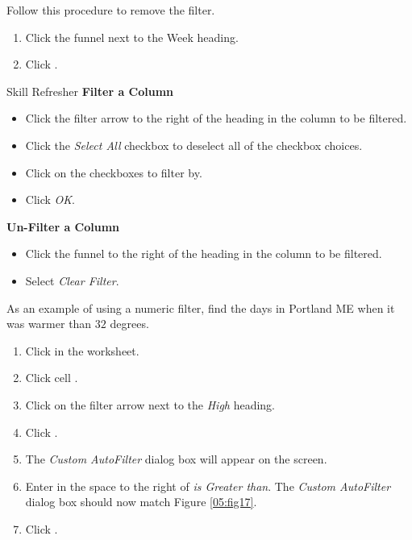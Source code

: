Follow this procedure to remove the filter.

\begin{enumerate}
	\item Click the funnel next to the Week heading.
	\item Click .
\end{enumerate}

\begin{center}
	\begin{sklbox}{Skill Refresher}
		\textbf{Filter a Column}
		\\
		\begin{itemize}
			\setlength{\itemsep}{0pt}
			\setlength{\parskip}{0pt}
			\setlength{\parsep}{0pt}

			\item Click the filter arrow to the right of the heading in the column to be filtered.
			\item Click the \textit{Select All} checkbox to deselect all of the checkbox choices.
			\item Click on the checkboxes to filter by.
			\item Click \textit{OK}.
			
		\end{itemize}
		
		\bigskip
		\textbf{Un-Filter a Column}
		
		\begin{itemize}
			\setlength{\itemsep}{0pt}
			\setlength{\parskip}{0pt}
			\setlength{\parsep}{0pt}
			
			\item Click the funnel to the right of the heading in the column to be filtered.
			\item Select \textit{Clear Filter}.
			
		\end{itemize}
	\end{sklbox}
\end{center}

As an example of using a numeric filter, find the days in Portland ME when it was warmer than $ 32 $ degrees.

\begin{enumerate}
	\item Click in the  worksheet.
	\item Click cell .
	\item Click on the filter arrow next to the \textit{High} heading.
	\item Click .
	\item The \textit{Custom AutoFilter} dialog box will appear on the screen.
	\item Enter  in the space to the right of \textit{is Greater than}. The \textit{Custom AutoFilter} dialog box should now match Figure \ref{05:fig17}.
	\item Click .
\end{enumerate}

